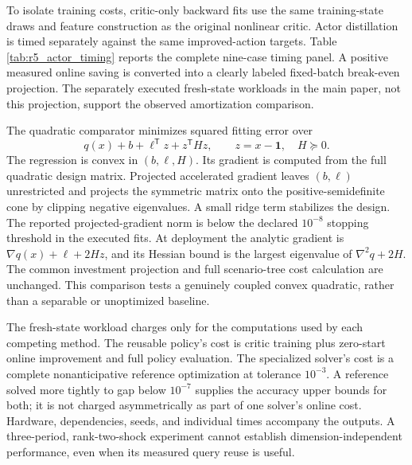 To isolate training costs, critic-only backward fits use the same training-state draws and feature construction as the original nonlinear critic. Actor distillation is timed separately against the same improved-action targets. Table \ref{tab:r5_actor_timing} reports the complete nine-case timing panel. A positive measured online saving is converted into a clearly labeled fixed-batch break-even projection. The separately executed fresh-state workloads in the main paper, not this projection, support the observed amortization comparison.


The quadratic comparator minimizes squared fitting error over
\[
 q(x)+b+\ell^\mathsf Tz+z^\mathsf THz,\qquad z=x-\mathbf1,\quad H\succeq0.
\]
The regression is convex in $(b,\ell,H)$. Its gradient is computed from the full quadratic design matrix. Projected accelerated gradient leaves $(b,\ell)$ unrestricted and projects the symmetric matrix onto the positive-semidefinite cone by clipping negative eigenvalues. A small ridge term stabilizes the design. The reported projected-gradient norm is below the declared $10^{-8}$ stopping threshold in the executed fits. At deployment the analytic gradient is $\nabla q(x)+\ell+2Hz$, and its Hessian bound is the largest eigenvalue of $\nabla^2q+2H$. The common investment projection and full scenario-tree cost calculation are unchanged. This comparison tests a genuinely coupled convex quadratic, rather than a separable or unoptimized baseline.

The fresh-state workload charges only for the computations used by each competing method. The reusable policy's cost is critic training plus zero-start online improvement and full policy evaluation. The specialized solver's cost is a complete nonanticipative reference optimization at tolerance $10^{-3}$. A reference solved more tightly to gap below $10^{-7}$ supplies the accuracy upper bounds for both; it is not charged asymmetrically as part of one solver's online cost. Hardware, dependencies, seeds, and individual times accompany the outputs. A three-period, rank-two-shock experiment cannot establish dimension-independent performance, even when its measured query reuse is useful.

